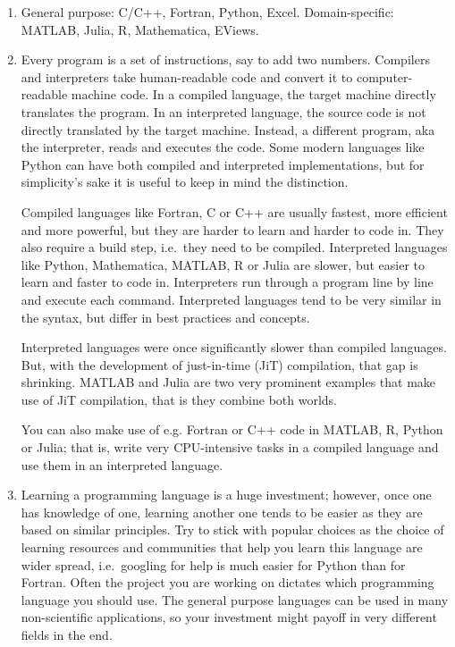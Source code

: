 \begin{enumerate}

\item
General purpose: C/C++, Fortran, Python, Excel.
Domain-specific: MATLAB, Julia, R, Mathematica, EViews.

\item
Every program is a set of instructions, say to add two numbers.
Compilers and interpreters take human-readable code and convert it to computer-readable machine code.
In a compiled language, the target machine directly translates the program.
In an interpreted language, the source code is not directly translated by the target machine.
Instead, a different program, aka the interpreter, reads and executes the code.
Some modern languages like Python can have both compiled and interpreted implementations,
  but for simplicity's sake it is useful to keep in mind the distinction.

Compiled languages like Fortran, C or C++ are usually fastest, more efficient and more powerful,
  but they are harder to learn and harder to code in.
They also require a build step, i.e.\ they need to be compiled.
Interpreted languages like Python, Mathematica, MATLAB, R or Julia are slower,
  but easier to learn and faster to code in.
Interpreters run through a program line by line and execute each command.
Interpreted languages tend to be very similar in the syntax,
  but differ in best practices and concepts.

Interpreted languages were once significantly slower than compiled languages.
But, with the development of just-in-time (JiT) compilation, that gap is shrinking.
MATLAB and Julia are two very prominent examples that make use of JiT compilation,
  that is they combine both worlds.

You can also make use of e.g. Fortran or C++ code in MATLAB, R, Python or Julia;
  that is, write very CPU-intensive tasks in a compiled language
  and use them in an interpreted language.

\item
Learning a programming language is a huge investment;
  however, once one has knowledge of one, learning another one tends to be easier
  as they are based on similar principles.
Try to stick with popular choices as the choice of learning resources and communities
  that help you learn this language are wider spread,
  i.e.\ googling for help is much easier for Python than for Fortran.
Often the project you are working on dictates which programming language you should use.
The general purpose languages can be used in many non-scientific applications,
  so your investment might payoff in very different fields in the end.


\end{enumerate}
